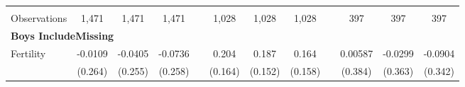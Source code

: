 \begin{landscape}
\begin{table}[htpb!]
\begin{center}
\begin{tabular}{lcccp{2mm}cccp{2mm}ccc}
\begin{footnotesize}\end{footnotesize}&\begin{footnotesize}\end{footnotesize}&\begin{footnotesize}\end{footnotesize}&\begin{footnotesize}\end{footnotesize}&\begin{footnotesize}\end{footnotesize}&\begin{footnotesize}\end{footnotesize}&\begin{footnotesize}\end{footnotesize}&\begin{footnotesize}\end{footnotesize}&\begin{footnotesize}\end{footnotesize}&\begin{footnotesize}\end{footnotesize}&\begin{footnotesize}\end{footnotesize}&\begin{footnotesize}\end{footnotesize}\\Observations&1,471&1,471&1,471&&1,028&1,028&1,028&&397&397&397\\
\multicolumn{12}{l}{\textbf{Boys IncludeMissing}}\\ 
Fertility&-0.0109&-0.0405&-0.0736&&0.204&0.187&0.164&&0.00587&-0.0299&-0.0904\\
&(0.264)&(0.255)&(0.258)&&(0.164)&(0.152)&(0.158)&&(0.384)&(0.363)&(0.342)\\

\end{tabular}
\end{center}
\end{table}
\end{landscape}
